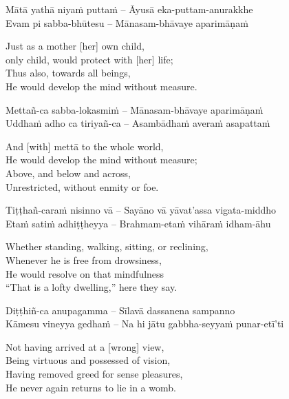 Mātā yathā niyaṁ puttaṁ – Āyusā eka-puttam-anurakkhe\\
Evam pi sabba-bhūtesu – Mānasam-bhāvaye aparimāṇaṁ

\begin{english-verses}
  Just as a mother [her] own child,\\\relax
  [Her] only child, would protect with [her] life; \\
  Thus also, towards all beings,\\
  He would develop the mind without measure.
\end{english-verses}

Mettañ-ca sabba-lokasmiṁ – Mānasam-bhāvaye aparimāṇaṁ\\
Uddhaṁ adho ca tiriyañ-ca – Asambādhaṁ averaṁ asapattaṁ

\begin{english-verses}
  And [with] mettā to the whole world,\\
  He would develop the mind without measure;\\
  Above, and below and across,\\
  Unrestricted, without enmity or foe.
\end{english-verses}

Tiṭṭhañ-caraṁ nisinno vā – Sayāno vā yāvat'assa vigata-middho\\
Etaṁ satiṁ adhiṭṭheyya – Brahmam-etaṁ vihāraṁ idham-āhu

\begin{english-verses}
  Whether standing, walking, sitting, or reclining,\\
  Whenever he is free from drowsiness,\\
  He would resolve on that mindfulness\\
  ``That is a lofty dwelling,'' here they say.
\end{english-verses}

Diṭṭhiñ-ca anupagamma – Sīlavā dassanena sampanno\\
Kāmesu vineyya gedhaṁ – Na hi jātu gabbha-seyyaṁ punar-etī'ti

\begin{english-verses}
  Not having arrived at a [wrong] view,\\
  Being virtuous and possessed of vision,\\
  Having removed greed for sense pleasures,\\
  He never again returns to lie in a womb.
\end{english-verses}

